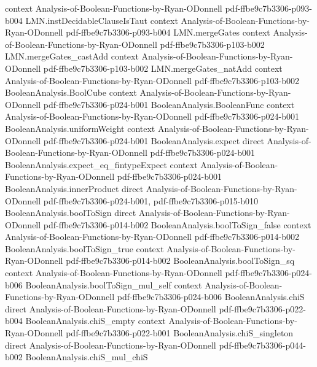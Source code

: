 \begin{lemma}
  {context}
  {Analysis-of-Boolean-Functions-by-Ryan-ODonnell}
  {pdf-ffbe9c7b3306-p093-b004}
\proofstep
  {LMN.instDecidableClauseIsTaut}
  {context}
  {Analysis-of-Boolean-Functions-by-Ryan-ODonnell}
  {pdf-ffbe9c7b3306-p093-b004}
\proofstep
  {LMN.mergeGates}
  {context}
  {Analysis-of-Boolean-Functions-by-Ryan-ODonnell}
  {pdf-ffbe9c7b3306-p103-b002}
\proofstep
  {LMN.mergeGates_castAdd}
  {context}
  {Analysis-of-Boolean-Functions-by-Ryan-ODonnell}
  {pdf-ffbe9c7b3306-p103-b002}
\proofstep
  {LMN.mergeGates_natAdd}
  {context}
  {Analysis-of-Boolean-Functions-by-Ryan-ODonnell}
  {pdf-ffbe9c7b3306-p103-b002}
\proofstep
  {BooleanAnalysis.BoolCube}
  {context}
  {Analysis-of-Boolean-Functions-by-Ryan-ODonnell}
  {pdf-ffbe9c7b3306-p024-b001}
\proofstep
  {BooleanAnalysis.BooleanFunc}
  {context}
  {Analysis-of-Boolean-Functions-by-Ryan-ODonnell}
  {pdf-ffbe9c7b3306-p024-b001}
\proofstep
  {BooleanAnalysis.uniformWeight}
  {context}
  {Analysis-of-Boolean-Functions-by-Ryan-ODonnell}
  {pdf-ffbe9c7b3306-p024-b001}
\proofstep
  {BooleanAnalysis.expect}
  {direct}
  {Analysis-of-Boolean-Functions-by-Ryan-ODonnell}
  {pdf-ffbe9c7b3306-p024-b001}
\proofstep
  {BooleanAnalysis.expect_eq_fintypeExpect}
  {context}
  {Analysis-of-Boolean-Functions-by-Ryan-ODonnell}
  {pdf-ffbe9c7b3306-p024-b001}
\proofstep
  {BooleanAnalysis.innerProduct}
  {direct}
  {Analysis-of-Boolean-Functions-by-Ryan-ODonnell}
  {pdf-ffbe9c7b3306-p024-b001,
    pdf-ffbe9c7b3306-p015-b010}
\proofstep
  {BooleanAnalysis.boolToSign}
  {direct}
  {Analysis-of-Boolean-Functions-by-Ryan-ODonnell}
  {pdf-ffbe9c7b3306-p014-b002}
\proofstep
  {BooleanAnalysis.boolToSign_false}
  {context}
  {Analysis-of-Boolean-Functions-by-Ryan-ODonnell}
  {pdf-ffbe9c7b3306-p014-b002}
\proofstep
  {BooleanAnalysis.boolToSign_true}
  {context}
  {Analysis-of-Boolean-Functions-by-Ryan-ODonnell}
  {pdf-ffbe9c7b3306-p014-b002}
\proofstep
  {BooleanAnalysis.boolToSign_sq}
  {context}
  {Analysis-of-Boolean-Functions-by-Ryan-ODonnell}
  {pdf-ffbe9c7b3306-p024-b006}
\proofstep
  {BooleanAnalysis.boolToSign_mul_self}
  {context}
  {Analysis-of-Boolean-Functions-by-Ryan-ODonnell}
  {pdf-ffbe9c7b3306-p024-b006}
\proofstep
  {BooleanAnalysis.chiS}
  {direct}
  {Analysis-of-Boolean-Functions-by-Ryan-ODonnell}
  {pdf-ffbe9c7b3306-p022-b004}
\proofstep
  {BooleanAnalysis.chiS_empty}
  {context}
  {Analysis-of-Boolean-Functions-by-Ryan-ODonnell}
  {pdf-ffbe9c7b3306-p022-b001}
\proofstep
  {BooleanAnalysis.chiS_singleton}
  {direct}
  {Analysis-of-Boolean-Functions-by-Ryan-ODonnell}
  {pdf-ffbe9c7b3306-p044-b002}
\proofstep
  {BooleanAnalysis.chiS_mul_chiS}

\end{lemma}
